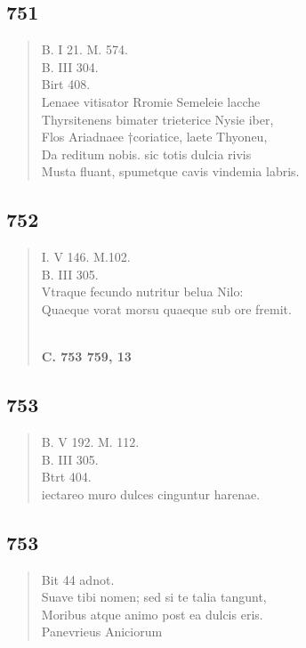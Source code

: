 \documentclass[11pt, a4paper]{report}
\begin{document}
            \subsection*{751}
      \begin{verse}
      B. I 21. M. 574. \\ B. III 304. \\ Birt 408. \\ Lenaee vitisator Rromie Semeleie lacche \\ Thyrsitenens bimater trieterice Nysie iber, \\ Flos Ariadnaee †coriatice, laete Thyoneu, \\ Da reditum nobis. sic totis dulcia rivis \\ Musta fluant, spumetque cavis vindemia labris. \\ 
      \end{verse}
  
            \subsection*{752}
      \begin{verse}
      I. V 146. M.102. \\ B. III 305. \\ Vtraque fecundo nutritur belua Nilo: \\ Quaeque vorat morsu quaeque sub ore fremit. \\ 
        ﻿\pagebreak 
     \marginpar{[234]} \begin{center} \textbf{C. 753 759, 13} \end{center}
      \end{verse}
  
            \subsection*{753}
      \begin{verse}
      B. V 192. M. 112. \\ B. III 305. \\ Btrt 404. \\ iectareo muro dulces cinguntur harenae. \\ 
      \end{verse}
  
            \subsection*{753}
      \begin{verse}
      Bit 44 adnot. \\ Suave tibi nomen; sed si te talia tangunt, \\ Moribus atque animo post ea dulcis eris. \\ Panevrieus Aniciorum \\ 
      \end{verse}
  
\end{document}
